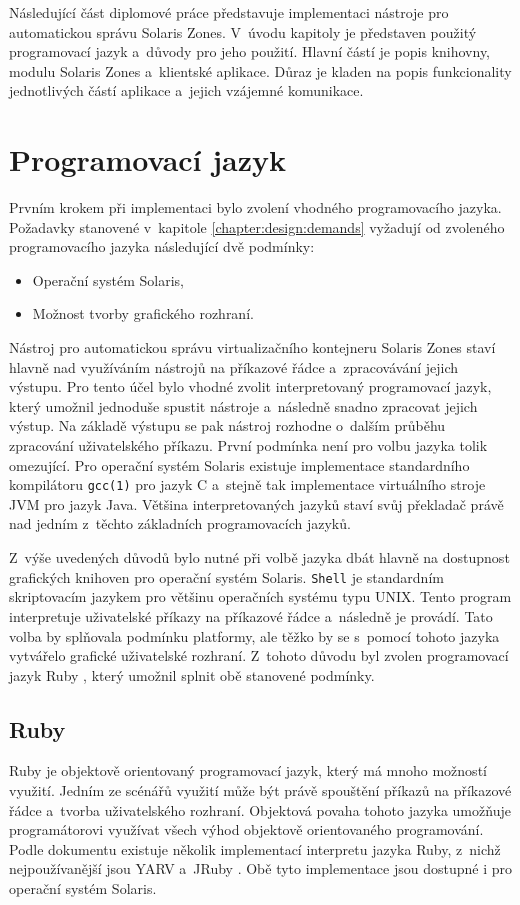 \label{chapter:implementation}
Následující část diplomové práce představuje implementaci nástroje pro automatickou správu Solaris Zones. V~úvodu
kapitoly je představen použitý programovací jazyk a~důvody pro jeho použití. Hlavní částí
je popis knihovny, modulu Solaris Zones a~klientské aplikace. Důraz je kladen na popis funkcionality jednotlivých 
částí aplikace a~jejich vzájemné komunikace.
\section{Programovací jazyk}
\label{chapter:implementation:language}
Prvním krokem  při implementaci bylo zvolení vhodného programovacího jazyka. Požadavky stanovené v~kapitole 
\ref{chapter:design:demands} vyžadují od zvoleného programovacího jazyka následující dvě podmínky:
\begin{itemize}
 \item Operační systém Solaris,
 \item Možnost tvorby grafického rozhraní.
\end{itemize}
Nástroj pro automatickou správu virtualizačního kontejneru Solaris Zones staví hlavně nad využíváním
nástrojů na příkazové řádce a~zpracovávání jejich výstupu. Pro tento účel bylo vhodné zvolit interpretovaný
programovací jazyk, který umožnil jednoduše spustit nástroje a~následně snadno zpracovat jejich výstup. Na základě
výstupu se pak nástroj rozhodne o~dalším průběhu zpracování uživatelského příkazu. První podmínka není pro volbu jazyka
tolik omezující. Pro operační systém Solaris existuje implementace standardního kompilátoru \verb|gcc(1)|
pro jazyk C a~stejně tak implementace virtuálního stroje JVM pro jazyk Java. Většina interpretovaných jazyků
staví svůj překladač právě nad jedním z~těchto základních programovacích jazyků.

Z~výše uvedených důvodů bylo nutné při volbě jazyka dbát hlavně na dostupnost grafických knihoven pro operační systém
Solaris. \verb|Shell| je standardním skriptovacím jazykem pro většinu operačních systému typu UNIX. Tento program
interpretuje uživatelské příkazy na příkazové řádce a~následně je provádí. Tato volba by splňovala podmínku platformy,
ale těžko by se s~pomocí tohoto jazyka vytvářelo grafické uživatelské rozhraní. Z~tohoto důvodu byl zvolen programovací
jazyk Ruby \cite{ruby}, který umožnil splnit obě stanovené podmínky.
\subsection{Ruby}
\label{chapter:implementation:language:ruby}
Ruby je objektově orientovaný programovací jazyk, který má mnoho možností využití. Jedním ze scénářů využití může být
právě spouštění příkazů na příkazové řádce a~tvorba uživatelského rozhraní. Objektová povaha tohoto jazyka umožňuje
programátorovi využívat všech výhod objektově orientovaného programování. Podle dokumentu \cite{ruby:implementation}
existuje několik implementací interpretu jazyka Ruby, z~nichž nejpoužívanější jsou YARV \cite{ruby:implementation:yarv} 
a~JRuby \cite{ruby:implementation:jruby}. Obě tyto implementace jsou dostupné i pro operační systém Solaris.

